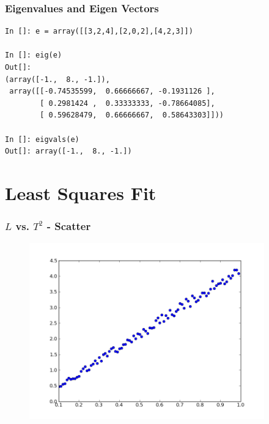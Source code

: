 \documentclass[14pt,compress]{beamer}
\newcounter{time}
\newcommand{\inctime}[1]{\addtocounter{time}{#1}{\tiny \thetime\ m}}
\begin{document}
\begin{frame}[fragile]
\frametitle{Eigenvalues and Eigen Vectors}
\begin{small}
\begin{lstlisting}
In []: e = array([[3,2,4],[2,0,2],[4,2,3]])

In []: eig(e)
Out[]: 
(array([-1.,  8., -1.]),
 array([[-0.74535599,  0.66666667, -0.1931126 ],
        [ 0.2981424 ,  0.33333333, -0.78664085],
        [ 0.59628479,  0.66666667,  0.58643303]]))

In []: eigvals(e)
Out[]: array([-1.,  8., -1.])
\end{lstlisting}
\end{small}
\end{frame}



\section{Least Squares Fit}
\begin{frame}[fragile]
\frametitle{$L$ vs. $T^2$ - Scatter}
\vspace{-0.15in}
\begin{figure}
\includegraphics[width=4in]{data/L-Tsq-points}
\end{figure}
\end{frame}
\end{document}
